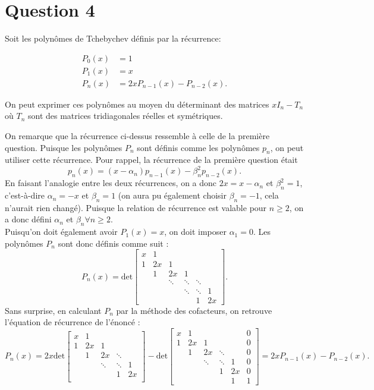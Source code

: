 \section*{Question 4}
Soit les polynômes de Tchebychev définis par la récurrence:

\begin{align}
  P_0(x) & = 1\\
  P_1(x) & = x\\
  P_n(x) & = 2xP_{n-1}(x) - P_{n-2}(x).
\end{align}

On peut exprimer ces polynômes au moyen du déterminant des matrices $xI_n - T_n$ où $T_n$ sont des matrices tridiagonales réelles et symétriques.

On remarque que la récurrence ci-dessus ressemble à celle de la première question. Puisque les polynômes $P_n$ sont définis comme les polynômes $p_n$, on peut utiliser cette récurrence. Pour rappel, la récurrence de la première question était $$p_n(x) = (x-\alpha_n)p_{n-1}(x) - \beta_n^2 p_{n-2}(x).$$
En faisant l'analogie entre les deux récurrences, on a donc $2x = x - \alpha_n$ et $\beta_n^2 = 1$, c'est-à-dire $\alpha_n = -x$ et $\beta_n = 1$ (on aura pu également choisir $\beta_n = -1$, cela n'aurait rien changé). Puisque la relation de récurrence est valable pour $n \geq 2$, on a donc défini $\alpha_n$ et $\beta_n \forall n \geq 2$.\\ Puisqu'on doit également avoir $P_1(x) = x$, on doit imposer $\alpha_1 = 0$. Les polynômes $P_n$ sont donc définis comme suit :
$$
P_n(x) = \text{det}
\left[
  \begin{array}{cccccc}
    x & 1 & & & &  \\
    1 & 2x & 1 & & & \\
      & 1 & 2x & 1 & & \\
      & & \ddots & \ddots & \ddots & \\
      & & & \ddots & \ddots &  1\\
      & & & &  1 & 2x
  \end{array}
\right].
$$
Sans surprise, en calculant $P_n$ par la méthode des cofacteurs, on retrouve l'équation de récurrence de l'énoncé :
$$
P_n(x) = 2x \text{det}
\left[
\begin{array}{ccccc}
x & 1 & & &  \\
1 & 2x & 1 & & \\
 & 1 & 2x & \ddots & \\
 & & \ddots & \ddots & 1  \\
 & & & 1 & 2x   \\
\end{array}
\right] - \text{det}
\left[
\begin{array}{cccccc}
x & 1 & & & & 0 \\
1 & 2x & 1 & & & 0\\
 & 1 & 2x & \ddots & & 0\\
 & & \ddots & \ddots & 1 & 0\\
 & & & 1 & 2x &  0\\
 & & & &  1 &  1
\end{array}
\right] = 2xP_{n-1}(x)-P_{n-2}(x).
$$


